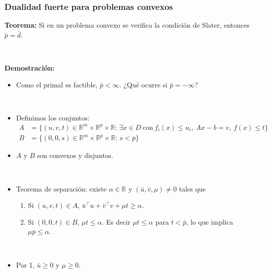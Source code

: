 \documentclass{beamer}
\begin{document}
\begin{frame}
\frametitle{Dualidad fuerte para problemas convexos}


\textbf{Teorema:} Si en un problema convexo se verifica la condición de Slater, entonces $\bar{p} =  \bar{d}$.

\

{\scriptsize 

{\bf Demostración:} 

\begin{itemize}
\item Como el primal es factible, $\bar{p}<\infty$. ¿Qué ocurre si $\bar{p}=-\infty$?

\

\item Definimos los conjuntos:
\begin{align*}
A &= \{(u,v,t)\in \mathbb{R}^m\times \mathbb{R}^p \times \mathbb{R}:\, \exists x\in D\ \mbox{con}\ 
f_i(x)\leq u_i,\ Ax-b=v,\ f(x)\leq t\} \\
B &= \{(0,0,s)\in \mathbb{R}^m\times \mathbb{R}^p \times \mathbb{R}:\, s<\bar{p}\}
\end{align*}



\item $A$ y $B$ son convexos y disjuntos.

\

\item Teorema de separación: existe $\alpha\in\mathbb{R}$ y $(\bar{u},\bar{v},\mu)\neq 0$ tales que 
\begin{enumerate}
\item Si $(u,v,t)\in A$, $\bar{u}^\top u + \bar{v}^\top v + \mu t \geq \alpha$.
\item Si $(0,0,t)\in B$, $ \mu t \leq \alpha$. Es decir  $\mu t \leq \alpha$ para $t<\bar{p}$, lo que implica $\mu\bar{p}\leq \alpha$.
\end{enumerate}

\

\item Por 1, $\bar{u}\geq 0$ y $\mu\geq 0$.

\end{itemize}


}

\end{frame}
\end{document}

